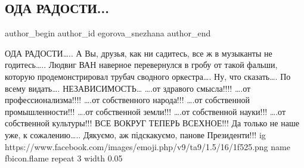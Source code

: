  
 
 
 
 
 
\subsection{ОДА РАДОСТИ...}
\label{sec:24_08_2021.fb.egorova_snezhana.3.oda_radosti_nezalezhnist}
 
\ifcmt
 author_begin
   author_id egorova_snezhana
 author_end
\fi

\obeycr
ОДА РАДОСТИ…..
\smallskip
А Вы, друзья, как ни садитесь, все ж в музыканты не годитесь…..
Людвиг ВАН наверное перевернулся в гробу от такой фальши, которую продемонстрировал трубач сводного оркестра….
Ну, что сказать….
По всему видать…. 
НЕЗАВИСИМОСТЬ…
….от здравого смысла!!!!
….от профессионализма!!!!
….от собственного народа!!!
….от собственной промышленности!!!
….от собственной земли!!!
….от собственной науки!!!
….от собственной культуры!!!
ВСЕ ВОКРУГ ТЕПЕРЬ ВСЕХНОЕ!!!
Да только не наше уже, к сожалению…..
Дякуємо, аж підскакуємо, панове Президенти!!!
\restorecr
\ifcmt
  ig https://www.facebook.com/images/emoji.php/v9/ta9/1.5/16/1f525.png
  name fbicon.flame
  repeat 3
  width 0.05
\fi


